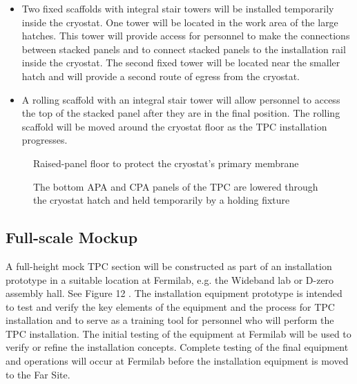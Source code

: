 \begin{itemize}
\item Two fixed scaffolds with integral stair towers will be installed temporarily inside the cryostat. One tower will be located in the work area of the large hatches. This tower will provide access for personnel to make the connections between stacked panels and to connect stacked panels to the installation rail inside the cryostat. The second fixed tower will be located near the smaller hatch and will provide a second route of egress from the cryostat. 
\item A rolling scaffold with an integral stair tower will allow personnel to access the top of the stacked panel after they are in the final position. The rolling scaffold will be moved around the cryostat floor as the TPC installation progresses. 
\end{itemize}

\begin{figure}[htbp]
\centering
\caption{Raised-panel floor to protect the cryostat’s primary membrane } 
\label{fig:raised-floor-protect}
\end{figure}

\begin{figure}[htbp]
\centering
\caption[holding fixture for lowering bottom APA and CPA panels]{The bottom APA and CPA panels of the TPC are lowered through the cryostat hatch and held temporarily by a holding fixture } 
\label{fig:panels-lowered-hatch}
\end{figure}

\subsection{Full-scale Mockup}
\label{fd:install:tempeqp:fsmockup}

A full-height mock TPC section will be constructed as part of an installation prototype in a suitable location at Fermilab, e.g. the Wideband lab or D-zero assembly hall. See Figure 12 . The installation 
equipment prototype is intended to test and verify the key elements of the equipment and the process for TPC installation and to serve as a training tool for personnel who will perform the TPC installation. The initial testing of the equipment at Fermilab will be used to verify or refine the installation concepts. 
Complete testing of the final equipment and operations will occur at Fermilab before the installation equipment is moved to the Far Site. 

